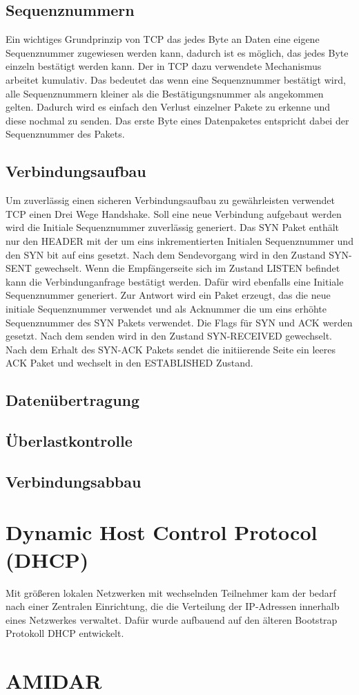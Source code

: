 \subsection{Sequenznummern}
Ein wichtiges Grundprinzip von TCP das jedes Byte an Daten eine eigene Sequenznummer zugewiesen werden kann, dadurch ist es möglich, das jedes Byte einzeln bestätigt werden kann. Der in TCP dazu verwendete Mechanismus arbeitet kumulativ. Das bedeutet das wenn eine Sequenznummer bestätigt wird, alle Sequenznummern kleiner als die Bestätigungsnummer als angekommen gelten. Dadurch wird es einfach den Verlust einzelner Pakete zu erkenne und diese nochmal zu senden. Das erste Byte eines Datenpaketes entspricht dabei der Sequenznummer des Pakets. 

\subsection{Verbindungsaufbau}
Um zuverlässig einen sicheren Verbindungsaufbau zu gewährleisten verwendet TCP einen Drei Wege Handshake. Soll eine neue Verbindung aufgebaut werden wird die Initiale Sequenznummer zuverlässig generiert. Das SYN Paket enthält nur den HEADER mit der um eins inkrementierten Initialen Sequenznummer und den SYN bit auf eins gesetzt. Nach dem Sendevorgang wird in den Zustand SYN-SENT gewechselt. Wenn die Empfängerseite sich im Zustand LISTEN befindet kann die Verbindunganfrage bestätigt werden. Dafür wird ebenfalls eine Initiale Sequenznummer generiert. Zur Antwort wird ein Paket erzeugt, das die neue initiale Sequenznummer verwendet und als Acknummer die um eins erhöhte Sequenznummer des SYN Pakets verwendet. Die Flags für SYN und ACK werden gesetzt. Nach dem senden wird in den Zustand SYN-RECEIVED gewechselt.\\
Nach dem Erhalt des SYN-ACK Pakets sendet die initiierende Seite ein leeres ACK Paket und wechselt in den ESTABLISHED Zustand. 
\subsection{Datenübertragung}

\subsection{Überlastkontrolle}

\subsection{Verbindungsabbau}

\section{Dynamic Host Control Protocol (DHCP)}
Mit größeren lokalen Netzwerken mit wechselnden Teilnehmer kam der bedarf nach einer Zentralen Einrichtung, die die Verteilung der IP-Adressen innerhalb eines Netzwerkes verwaltet. Dafür wurde aufbauend auf den älteren Bootstrap Protokoll DHCP entwickelt.

\section{AMIDAR}
